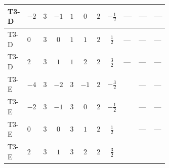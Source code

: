 \documentclass[8pt]{article}
\begin{document}
\begin{landscape}
\begin{longtable}{@{}llcccccc >{\raggedright\arraybackslash}p{0.21\linewidth} >{\raggedright\arraybackslash}p{0.21\linewidth} >{\raggedright\arraybackslash}p{0.21\linewidth}@{}}
\midrule
T3-D & $-2$ & $3$ & $-1$ & $1$ & $0$ & $2$ & $-\frac{1}{2}$ & --- & --- & --- \\
\midrule
T3-D & $0$ & $3$ & $0$ & $1$ & $1$ & $2$ & $\frac{1}{2}$ & --- & --- & --- \\
\midrule
T3-D & $2$ & $3$ & $1$ & $1$ & $2$ & $2$ & $\frac{3}{2}$ & --- & --- & --- \\
\midrule
T3-E & $-4$ & $3$ & $-2$ & $3$ & $-1$ & $2$ & $-\frac{3}{2}$ & \scriptsize\adjustbox{max width=\linewidth}{$\begin{gathered} -\frac{{\lambda_{12}^{(\times)}}^2}{2}\end{gathered}$} & --- & --- \\
\midrule
T3-E & $-2$ & $3$ & $-1$ & $3$ & $0$ & $2$ & $-\frac{1}{2}$ & \scriptsize\adjustbox{max width=\linewidth}{$\begin{gathered} -\frac{{\lambda_{12}^{(\times)}}^2}{2}\end{gathered}$} & --- & --- \\
\midrule
T3-E & $0$ & $3$ & $0$ & $3$ & $1$ & $2$ & $\frac{1}{2}$ & \scriptsize\adjustbox{max width=\linewidth}{$\begin{gathered} -\frac{{\lambda_{12}^{(\times)}}^2}{2}\end{gathered}$} & --- & --- \\
\midrule
T3-E & $2$ & $3$ & $1$ & $3$ & $2$ & $2$ & $\frac{3}{2}$ & \scriptsize\adjustbox{max width=\linewidth}{$\begin{gathered} -\frac{{\lambda_{12}^{(\times)}}^2}{2}\end{gathered}$} & \scriptsize\adjustbox{max width=\linewidth}{$\begin{gathered} +{g_1}^2 \left(36 {g_2}^2-6 {\lambda_{S_2}^{(1)}}-48 {\lambda_{S_2}^{(A)}}\right)\end{gathered}$} & \scriptsize\adjustbox{max width=\linewidth}{$\begin{gathered} +24 {g_1}^4\end{gathered}$} \\
\midrule
\bottomrule
\end{longtable}
\end{landscape}
\end{document}
